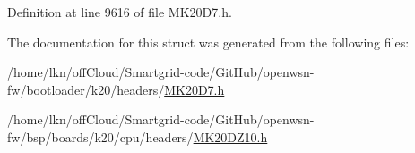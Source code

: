 Definition at line 9616 of file M\+K20\+D7.\+h.



The documentation for this struct was generated from the following files\+:\begin{DoxyCompactItemize}
\item 
/home/lkn/off\+Cloud/\+Smartgrid-\/code/\+Git\+Hub/openwsn-\/fw/bootloader/k20/headers/\hyperlink{bootloader_2k20_2headers_2_m_k20_d7_8h}{M\+K20\+D7.\+h}\item 
/home/lkn/off\+Cloud/\+Smartgrid-\/code/\+Git\+Hub/openwsn-\/fw/bsp/boards/k20/cpu/headers/\hyperlink{_m_k20_d_z10_8h}{M\+K20\+D\+Z10.\+h}\end{DoxyCompactItemize}
